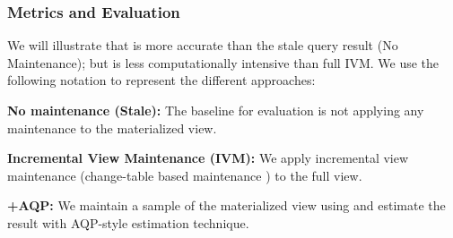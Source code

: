 \subsubsection{Metrics and Evaluation}
We will illustrate that \svc is more accurate than the stale query result (No Maintenance); but is less computationally intensive than full IVM. 
We use the following notation to represent the different approaches:

\noindent\textbf{No maintenance (Stale): } The baseline for evaluation is not applying any maintenance to the materialized view.

\noindent\textbf{Incremental View Maintenance (IVM): } We apply incremental view maintenance (change-table based maintenance \cite{gupta1995maintenance,gupta2006incremental, DBLP:journals/vldb/KochAKNNLS14}) to the full view.

\noindent\textbf{\svcnospace+AQP: } We maintain a sample of the materialized view using \svc and estimate the result with AQP-style estimation technique. 

